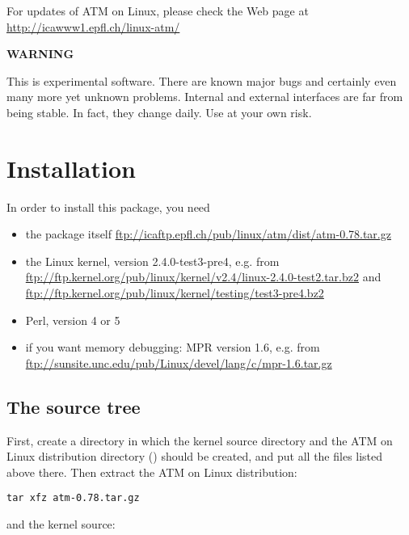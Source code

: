

For updates of ATM on Linux, please check the Web page at
\url{http://icawww1.epfl.ch/linux-atm/}

\vskip1cm
\centerline{\bf WARNING}

This is experimental software. There are known major bugs and certainly
even many more yet unknown problems. Internal and external interfaces are
far from being stable. In fact, they change daily. Use at your own risk.




\section{Installation}

In order to install this package, you need
\begin{itemize}
  \item the package itself
    \url{ftp://icaftp.epfl.ch/pub/linux/atm/dist/atm-0.78.tar.gz}
  \item the Linux kernel, version 2.4.0-test3-pre4, e.g. from
    \url{ftp://ftp.kernel.org/pub/linux/kernel/v2.4/linux-2.4.0-test2.tar.bz2}
    and
    \url{ftp://ftp.kernel.org/pub/linux/kernel/testing/test3-pre4.bz2}
  \item Perl, version 4 or 5
  \item if you want memory debugging: MPR version 1.6, e.g. from
    \url{ftp://sunsite.unc.edu/pub/Linux/devel/lang/c/mpr-1.6.tar.gz}
\end{itemize}


\subsection{The source tree}

First, create a directory in which the  kernel source directory
and the ATM on Linux distribution directory () should be created,
and put all the files listed above there. Then extract the ATM on Linux
distribution:

\begin{verbatim}
tar xfz atm-0.78.tar.gz
\end{verbatim}

and the kernel source:

